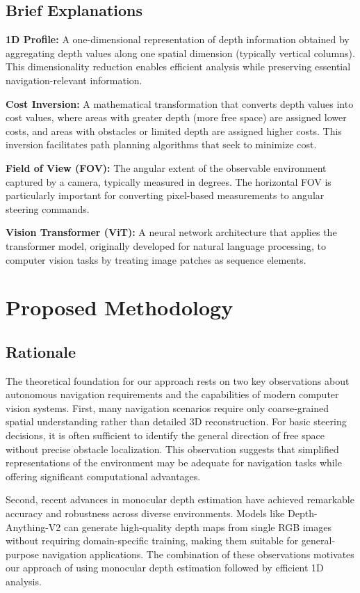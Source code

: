 \documentclass[conference]{IEEEtran}
\begin{document}
\subsection{Brief Explanations}
\textbf{1D Profile:} A one-dimensional representation of depth information obtained by aggregating depth values along one spatial dimension (typically vertical columns). This dimensionality reduction enables efficient analysis while preserving essential navigation-relevant information.

\textbf{Cost Inversion:} A mathematical transformation that converts depth values into cost values, where areas with greater depth (more free space) are assigned lower costs, and areas with obstacles or limited depth are assigned higher costs. This inversion facilitates path planning algorithms that seek to minimize cost.

\textbf{Field of View (FOV):} The angular extent of the observable environment captured by a camera, typically measured in degrees. The horizontal FOV is particularly important for converting pixel-based measurements to angular steering commands.

\textbf{Vision Transformer (ViT):} A neural network architecture that applies the transformer model, originally developed for natural language processing, to computer vision tasks by treating image patches as sequence elements.

\section{Proposed Methodology}

\subsection{Rationale}
The theoretical foundation for our approach rests on two key observations about autonomous navigation requirements and the capabilities of modern computer vision systems. First, many navigation scenarios require only coarse-grained spatial understanding rather than detailed 3D reconstruction. For basic steering decisions, it is often sufficient to identify the general direction of free space without precise obstacle localization. This observation suggests that simplified representations of the environment may be adequate for navigation tasks while offering significant computational advantages.

Second, recent advances in monocular depth estimation have achieved remarkable accuracy and robustness across diverse environments. Models like Depth-Anything-V2 can generate high-quality depth maps from single RGB images without requiring domain-specific training, making them suitable for general-purpose navigation applications. The combination of these observations motivates our approach of using monocular depth estimation followed by efficient 1D analysis.
\end{document}
